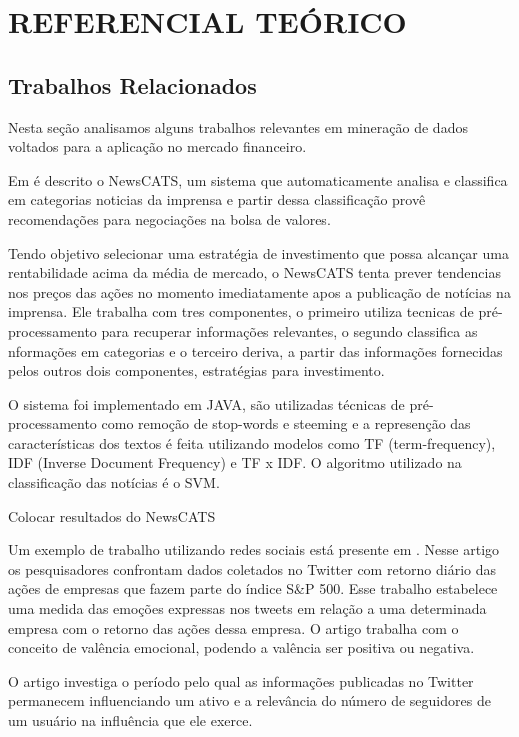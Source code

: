 
\chapter{REFERENCIAL TEÓRICO}

\section{Trabalhos Relacionados}
Nesta seção analisamos alguns trabalhos relevantes em mineração de dados voltados para a aplicação no mercado financeiro.

Em \cite{Mittermayer2004} é descrito o NewsCATS, um sistema que automaticamente analisa e classifica em categorias noticias da imprensa e partir dessa classificação provê recomendações para negociações na bolsa de valores.

Tendo objetivo selecionar uma estratégia de investimento que possa alcançar uma rentabilidade acima da média de mercado, o NewsCATS tenta prever tendencias nos preços das ações no momento imediatamente apos a publicação de notícias na imprensa. Ele trabalha com tres componentes, o primeiro utiliza tecnicas de pré-processamento para recuperar informações relevantes, o segundo classifica as nformações em categorias e o terceiro deriva, a partir das informações fornecidas pelos outros dois componentes, estratégias para investimento.

O sistema foi implementado em JAVA, são utilizadas técnicas de pré-processamento como remoção de stop-words e steeming e a represenção das características dos textos é feita utilizando modelos como TF (term-frequency), IDF (Inverse Document Frequency) e TF x IDF. O algoritmo utilizado na classificação das notícias é o SVM.

Colocar resultados do NewsCATS

Um exemplo de trabalho utilizando redes sociais está presente em \cite{SulDennisYuan2014}. Nesse artigo os pesquisadores confrontam dados coletados no Twitter com retorno diário das ações de empresas que fazem parte do índice S\&P 500. Esse trabalho estabelece uma medida das emoções expressas nos tweets em relação a uma determinada empresa com o retorno das ações dessa empresa. O artigo trabalha com o conceito de valência emocional, podendo a valência ser positiva ou negativa.

O artigo investiga o período pelo qual as informações publicadas no Twitter permanecem influenciando um ativo e a relevância do número de seguidores de um usuário na influência que ele exerce.

